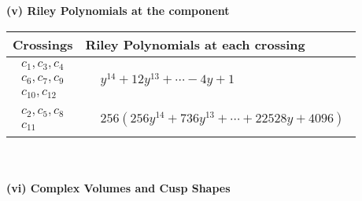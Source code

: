 \documentclass[1p]{elsarticle_modified}
\theoremstyle{definition}
\begin{document}
\newpage\renewcommand{\arraystretch}{1}
\flushleft \textbf{(v) Riley Polynomials at the component}\newline \\
\begin{tabular}{m{50pt}|m{274pt}}
Crossings & \hspace{64pt}Riley Polynomials at each crossing \\
\hline $$\begin{aligned}c_{1},c_{3},c_{4}\\c_{6},c_{7},c_{9}\\c_{10},c_{12}\end{aligned}$$&$\begin{aligned}
&y^{14}+12 y^{13}+\cdots-4 y+1
\end{aligned}$\\
\hline $$\begin{aligned}c_{2},c_{5},c_{8}\\c_{11}\end{aligned}$$&$\begin{aligned}
&256(256 y^{14}+736 y^{13}+\cdots+22528 y+4096)
\end{aligned}$\\
\hline
\end{tabular}\\~\\
\newpage\flushleft \textbf{(vi) Complex Volumes and Cusp Shapes}
\end{document}
